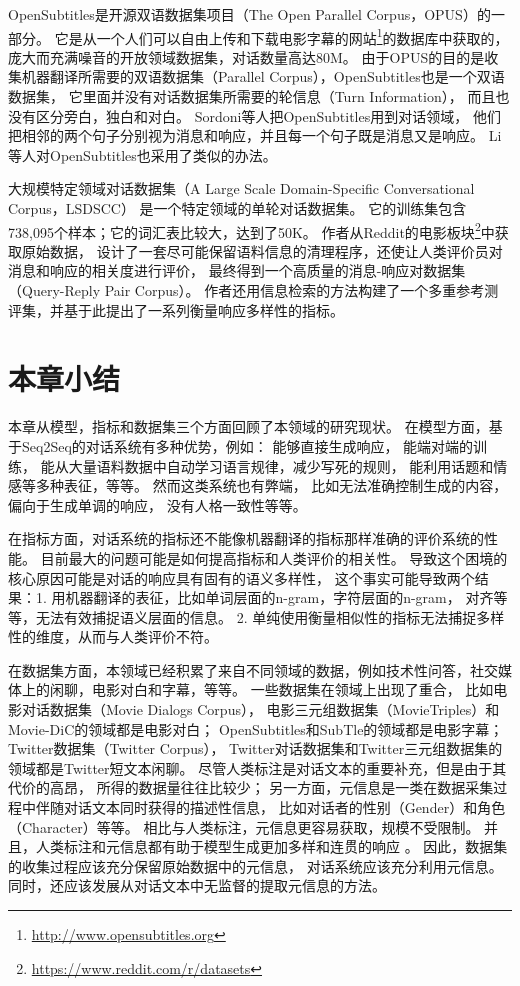 OpenSubtitles是开源双语数据集项目（The Open Parallel Corpus，OPUS）的一部分。
它是从一个人们可以自由上传和下载电影字幕的网站\footnote{\url{http://www.opensubtitles.org}}的数据库中获取的，
庞大而充满噪音的开放领域数据集，对话数量高达80M。
由于OPUS的目的是收集机器翻译所需要的双语数据集（Parallel Corpus），OpenSubtitles也是一个双语数据集，
它里面并没有对话数据集所需要的轮信息（Turn Information），
而且也没有区分旁白，独白和对白。
Sordoni等人把OpenSubtitles用到对话领域，
他们把相邻的两个句子分别视为消息和响应，并且每一个句子既是消息又是响应。
Li等人对OpenSubtitles也采用了类似的办法。

大规模特定领域对话数据集（A Large Scale Domain-Specific Conversational Corpus，LSDSCC）
是一个特定领域的单轮对话数据集。
它的训练集包含738,095个样本；它的词汇表比较大，达到了50K。
作者从Reddit的电影板块\footnote{\url{https://www.reddit.com/r/datasets}}中获取原始数据，
设计了一套尽可能保留语料信息的清理程序，还使让人类评价员对消息和响应的相关度进行评价，
最终得到一个高质量的消息-响应对数据集（Query-Reply Pair Corpus）。
作者还用信息检索的方法构建了一个多重参考测评集，并基于此提出了一系列衡量响应多样性的指标。

\section{本章小结}\label{sec:rw_conclusion}
本章从模型，指标和数据集三个方面回顾了本领域的研究现状。
在模型方面，基于Seq2Seq的对话系统有多种优势，例如：
能够直接生成响应，
能端对端的训练，
能从大量语料数据中自动学习语言规律，减少写死的规则，
能利用话题和情感等多种表征，等等。
然而这类系统也有弊端，
比如无法准确控制生成的内容，
偏向于生成单调的响应，
没有人格一致性等等。

在指标方面，对话系统的指标还不能像机器翻译的指标那样准确的评价系统的性能。
目前最大的问题可能是如何提高指标和人类评价的相关性。
导致这个困境的核心原因可能是对话的响应具有固有的语义多样性，
这个事实可能导致两个结果：1. 用机器翻译的表征，比如单词层面的n-gram，字符层面的n-gram，
对齐等等，无法有效捕捉语义层面的信息。
2. 单纯使用衡量相似性的指标无法捕捉多样性的维度，从而与人类评价不符。

在数据集方面，本领域已经积累了来自不同领域的数据，例如技术性问答，社交媒体上的闲聊，电影对白和字幕，等等。
一些数据集在领域上出现了重合，
比如电影对话数据集（Movie Dialogs Corpus），
电影三元组数据集（MovieTriples）和Movie-DiC的领域都是电影对白；
OpenSubtitles和SubTle的领域都是电影字幕；
Twitter数据集（Twitter Corpus），
Twitter对话数据集和Twitter三元组数据集的领域都是Twitter短文本闲聊。
尽管人类标注是对话文本的重要补充，但是由于其代价的高昂，
所得的数据量往往比较少；
另一方面，元信息是一类在数据采集过程中伴随对话文本同时获得的描述性信息，
比如对话者的性别（Gender）和角色（Character）等等。
相比与人类标注，元信息更容易获取，规模不受限制。
并且，人类标注和元信息都有助于模型生成更加多样和连贯的响应
。
因此，数据集的收集过程应该充分保留原始数据中的元信息，
对话系统应该充分利用元信息。
同时，还应该发展从对话文本中无监督的提取元信息的方法。
